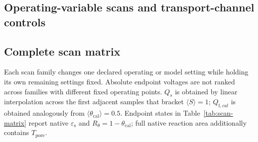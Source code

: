 \documentclass[11pt]{article}
\let\SIorigsubsection\subsection
\renewcommand{\subsection}{\FloatBarrier\SIorigsubsection}
\newcommand{\epss}{\varepsilon_{\mathrm{s}}}
\newcommand{\thetacal}{\theta_{\mathrm{cal}}}
\newcommand{\Rtheta}{R_{\theta}}
\newcommand{\Tpore}{T_{\mathrm{pore}}}
\begin{document}
\begin{landscape}
\section{Operating-variable scans and transport-channel controls}

\subsection{Complete scan matrix}

Each scan family changes one declared operating or model setting while holding its own remaining settings
fixed. Absolute endpoint voltages are not ranked across families with different fixed operating points.
$Q_s$ is obtained by linear interpolation across the first adjacent samples that bracket
$\langle S\rangle=1$; $Q_{\mathrm f,cal}$ is obtained analogously from $\langle\thetacal\rangle=0.5$. Endpoint
states in Table~\ref{tab:scan-matrix} report native $\epss$ and $\Rtheta=1-\thetacal$; full native reaction
area additionally contains $\Tpore$.


\end{landscape}
\end{document}
